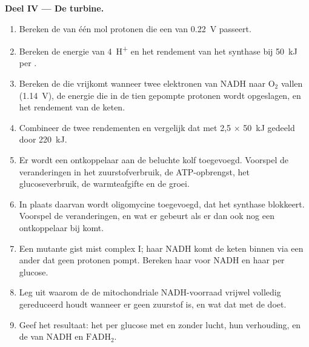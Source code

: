 \begin{problem}
\medskip
\noindent\textbf{Deel IV --- De turbine.}
\begin{enumerate}[resume]
  \item Bereken de  van één mol protonen die een
         van \qty{0.22}{V} passeert.
  \item Bereken de energie van \qty{4}{H^+} en het rendement van het
        synthase bij \qty{50}{kJ} per .
  \item Bereken de  die vrijkomt wanneer twee elektronen van
        NADH naar $\mathrm{O_2}$ vallen (\qty{1.14}{V}), de energie die in
        de tien gepompte protonen wordt opgeslagen, en het rendement van de
        keten.
  \item Combineer de twee rendementen en vergelijk dat met 2,5 
        $\times$ \qty{50}{kJ} gedeeld door \qty{220}{kJ}.
  \item Er wordt een ontkoppelaar aan de beluchte kolf toegevoegd.
        Voorspel de veranderingen in het zuurstofverbruik, de
        ATP-opbrengst, het glucoseverbruik, de warmteafgifte en de groei.
  \item In plaats daarvan wordt oligomycine toegevoegd, dat het synthase
        blokkeert. Voorspel de veranderingen, en wat er gebeurt als er dan
        ook nog een ontkoppelaar bij komt.
  \item Een mutante gist mist complex I; haar NADH komt de keten binnen via
        een ander  dat geen protonen pompt. Bereken haar
         voor NADH en haar  per glucose.
  \item Leg uit waarom de  de mitochondriale NADH-voorraad vrijwel
        volledig gereduceerd houdt wanneer er geen zuurstof is, en wat dat
        met de  doet.
  \item Geef het resultaat: het  per glucose met en zonder lucht, hun
        verhouding, en de  van NADH en $\mathrm{FADH_2}$.
\end{enumerate}
\end{problem}

